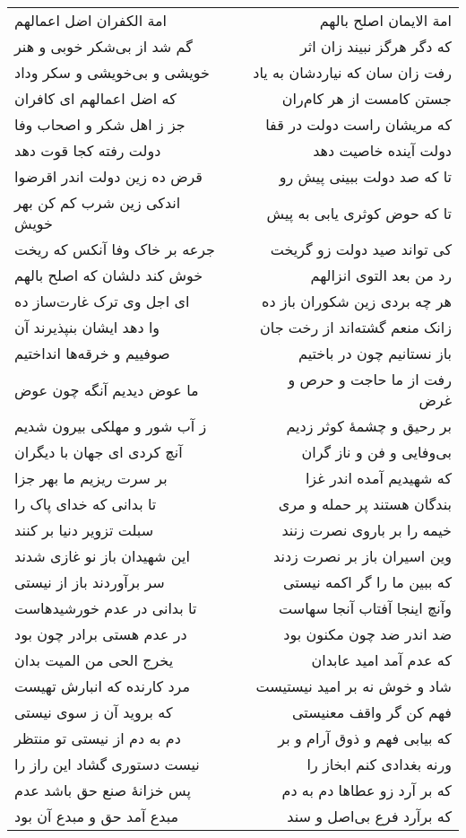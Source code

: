 \begin{center}
\begin{longtable}{l p{0.5cm} r}
امة الکفران اضل اعمالهم
&&
امة الایمان اصلح بالهم
\\
گم شد از بی‌شکر خوبی و هنر
&&
که دگر هرگز نبیند زان اثر
\\
خویشی و بی‌خویشی و سکر وداد
&&
رفت زان سان که نیاردشان به یاد
\\
که اضل اعمالهم ای کافران
&&
جستن کامست از هر کام‌ران
\\
جز ز اهل شکر و اصحاب وفا
&&
که مریشان راست دولت در قفا
\\
دولت رفته کجا قوت دهد
&&
دولت آینده خاصیت دهد
\\
قرض ده زین دولت اندر اقرضوا
&&
تا که صد دولت ببینی پیش رو
\\
اندکی زین شرب کم کن بهر خویش
&&
تا که حوض کوثری یابی به پیش
\\
جرعه بر خاک وفا آنکس که ریخت
&&
کی تواند صید دولت زو گریخت
\\
خوش کند دلشان که اصلح بالهم
&&
رد من بعد التوی انزالهم
\\
ای اجل وی ترک غارت‌ساز ده
&&
هر چه بردی زین شکوران باز ده
\\
وا دهد ایشان بنپذیرند آن
&&
زانک منعم گشته‌اند از رخت جان
\\
صوفییم و خرقه‌ها انداختیم
&&
باز نستانیم چون در باختیم
\\
ما عوض دیدیم آنگه چون عوض
&&
رفت از ما حاجت و حرص و غرض
\\
ز آب شور و مهلکی بیرون شدیم
&&
بر رحیق و چشمهٔ کوثر زدیم
\\
آنچ کردی ای جهان با دیگران
&&
بی‌وفایی و فن و ناز گران
\\
بر سرت ریزیم ما بهر جزا
&&
که شهیدیم آمده اندر غزا
\\
تا بدانی که خدای پاک را
&&
بندگان هستند پر حمله و مری
\\
سبلت تزویر دنیا بر کنند
&&
خیمه را بر باروی نصرت زنند
\\
این شهیدان باز نو غازی شدند
&&
وین اسیران باز بر نصرت زدند
\\
سر برآوردند باز از نیستی
&&
که ببین ما را گر اکمه نیستی
\\
تا بدانی در عدم خورشیدهاست
&&
وآنچ اینجا آفتاب آنجا سهاست
\\
در عدم هستی برادر چون بود
&&
ضد اندر ضد چون مکنون بود
\\
یخرج الحی من المیت بدان
&&
که عدم آمد امید عابدان
\\
مرد کارنده که انبارش تهیست
&&
شاد و خوش نه بر امید نیستیست
\\
که بروید آن ز سوی نیستی
&&
فهم کن گر واقف معنیستی
\\
دم به دم از نیستی تو منتظر
&&
که بیابی فهم و ذوق آرام و بر
\\
نیست دستوری گشاد این راز را
&&
ورنه بغدادی کنم ابخاز را
\\
پس خزانهٔ صنع حق باشد عدم
&&
که بر آرد زو عطاها دم به دم
\\
مبدع آمد حق و مبدع آن بود
&&
که برآرد فرع بی‌اصل و سند
\\
\end{longtable}
\end{center}
